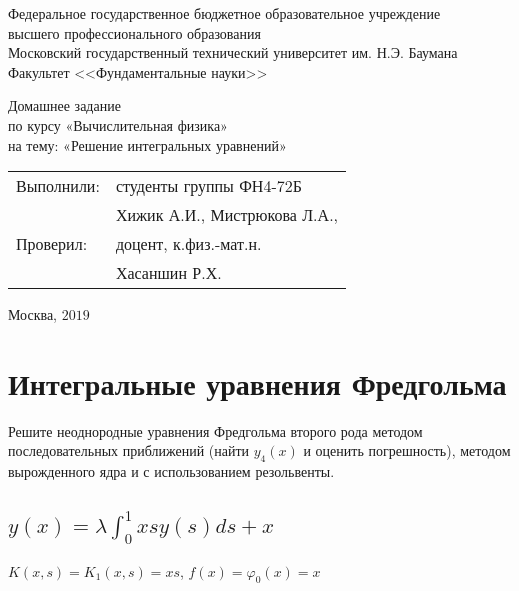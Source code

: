 \documentclass[
11pt,
master, %
subf, %
href, %
colorlinks=true, %
times, %
]{disser}
\begin{document}
	
	\pagestyle{empty}
	\begin{center}
		
		\noindent  Федеральное государственное бюджетное образовательное учреждение\\
		высшего профессионального образования\\
		
		Московский государственный технический университет им. Н.Э. Баумана \\
		Факультет <<Фундаментальные науки>>\bigskip\\
		
		\vfill
		
		Домашнее задание\\
		по курсу «Вычислительная физика»\\
		на тему: «Решение интегральных уравнений»\\
		
		
		\vfill
		\vfill
		\begin{flushright}
			\begin{tabular}{ll}
				Выполнили: & студенты группы ФН4-72Б     \\
				& Хижик А.И., Мистрюкова Л.А.,  \\
				Проверил:  & доцент, к.физ.-мат.н.       \\
				& Хасаншин Р.Х.
			\end{tabular}
		\end{flushright}
		\vfill
		\begin{center}
			Москва, $2019$
		\end{center}
		
	\end{center}
	\pagebreak
	
	
	\pagestyle{plain}
	\tableofcontents

\section{Интегральные уравнения Фредгольма}
Решите неоднородные уравнения Фредгольма второго рода методом последовательных приближений (найти $y_4(x)$ и оценить погрешность), методом вырожденного ядра и с использованием резольвенты.

\subsection{$\displaystyle y(x) = \lambda \int_{0}^{1} x s y(s)ds + x$}

$\displaystyle K(x,s) = K_1(x,s) = xs$, $f(x) = \varphi_0(x) = x$
\end{document}
